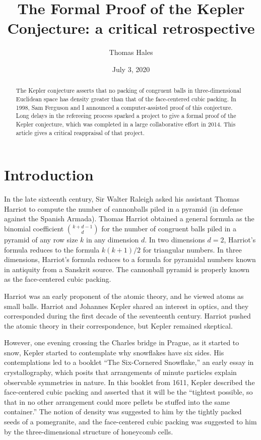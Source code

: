 \documentclass{amsart}
\title{The Formal Proof of the Kepler Conjecture: a critical retrospective}
\author{Thomas Hales}
\date{}
\date{July 3, 2020}
\begin{document}
\maketitle

\begin{abstract} 
  The Kepler conjecture asserts that no packing of congruent balls in
  three-dimensional Euclidean space has density greater than that of the
  face-centered cubic packing.  In 1998, Sam Ferguson and I
  announced a computer-assisted proof of this conjecture.  Long delays
  in the refereeing process sparked a project to give a formal proof
  of the Kepler conjecture, which was completed in a large
  collaborative effort in 2014.  This article gives a critical
  reappraisal of that project.
\end{abstract}

\baselineskip
{}\baselineskip

\newenvironment{blockquote}{%
  \par%
  \medskip%
  \baselineskip=0.7\baselineskip%
  \leftskip=2em\rightskip=2em%
  \noindent\ignorespaces}{%
  \par\medskip}

\section{Introduction}

In the late sixteenth century, Sir Walter Raleigh asked his assistant
Thomas Harriot to compute the number of cannonballs piled in a pyramid
(in defense against the Spanish Armada).  Thomas Harriot obtained a
general formula as the binomial coefficient ${k+d-1\choose d}$ for the
number of congruent balls piled in a pyramid of any row size $k$ in
any dimension $d$.  In two dimensions $d=2$, Harriot's formula reduces
to the formula $k(k+1)/2$ for triangular numbers.  In three
dimensions, Harriot's formula reduces to a formula for pyramidal
numbers known in antiquity from a Sanskrit source.  The cannonball
pyramid is properly known as the face-centered cubic packing.

Harriot was an early proponent of the atomic theory, and he viewed
atoms as small balls.  Harriot and Johannes Kepler shared an interest in
optics, and they corresponded during the first decade of the
seventeenth century.  Harriot pushed the atomic theory in their
correspondence, but Kepler remained skeptical.

However, one evening crossing the Charles bridge in Prague, as it
started to snow, Kepler started to contemplate why snowflakes have six
sides.  His contemplations led to a booklet ``The Six-Cornered
Snowflake,'' an early essay in crystallography, which posits that
arrangements of minute particles explain observable symmetries in
nature.  In this booklet from 1611, Kepler described the face-centered
cubic packing and asserted that it will be the ``tightest possible, so
that in no other arrangement could more pellets be stuffed into the
same container.'' The notion of density was suggested to him by the
tightly packed seeds of a pomegranite, and the face-centered cubic
packing was suggested to him by the three-dimensional structure of
honeycomb cells.
\end{document}
